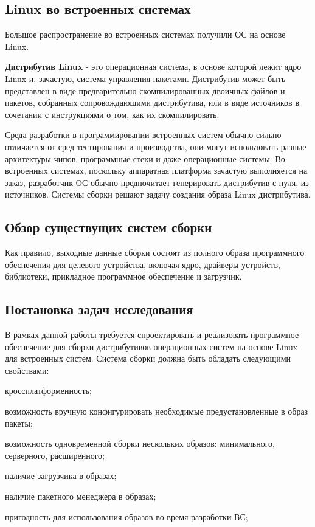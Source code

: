\newpage
\subsection{Linux во встроенных системах}

Большое распространение во встроенных системах получили ОС на основе Linux.

\textbf{Дистрибутив Linux} - это операционная система, в основе которой лежит ядро Linux и, зачастую, система управления пакетами. 
Дистрибутив может быть представлен в виде предварительно скомпилированных двоичных файлов и пакетов, собранных сопровождающими дистрибутива, или в виде источников в сочетании с инструкциями о том, как их скомпилировать.

Среда разработки в программировании встроенных систем обычно сильно отличается от сред тестирования и производства, они могут использовать разные архитектуры чипов, программные стеки и даже операционные системы.
Во встроенных системах, поскольку аппаратная платформа зачастую выполняется на заказ, разработчик ОС обычно предпочитает генерировать дистрибутив с нуля, из источников.
Системы сборки решают задачу создания образа Linux дистрибутива. 

\newpage
\subsection{Обзор существущих систем сборки}
Как правило, выходные данные сборки состоят из полного образа программного обеспечения для целевого устройства, включая ядро, драйверы устройств, библиотеки, прикладное программное обеспечение и загрузчик.

\newpage
\subsection{Постановка задач исследования}
В рамках данной работы требуется спроектировать и реализовать программное обеспечение для сборки дистрибутивов операционных систем на основе Linux для встроенных систем.
Система сборки должна быть обладать следующими свойствами:
\begin{dashitemize}
  \item кроссплатформенность;
  \item возможность вручную конфигурировать необходимые предустановленные в образ пакеты;
  \item возможность одновременной сборки нескольких образов: минимального, серверного, расширенного;
  \item наличие загрузчика в образах;
  \item наличие пакетного менеджера в образах;
  \item пригодность для использования образов во время разработки ВС;
\end{dashitemize}
\newpage
